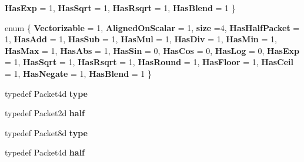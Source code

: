 \begin{DoxyCompactItemize}
{\bfseries Has\+Exp} = 1, 
{\bfseries Has\+Sqrt} = 1, 
{\bfseries Has\+Rsqrt} = 1, 
\newline
{\bfseries Has\+Blend} = 1
 \}
\item 
\mbox{\label{struct_eigen_1_1internal_1_1packet__traits_3_01double_01_4_acacfdb8bbbc458acc112aba3c5d4d400}} 
enum \{ \newline
{\bfseries Vectorizable} = 1, 
{\bfseries Aligned\+On\+Scalar} = 1, 
{\bfseries size} =4, 
{\bfseries Has\+Half\+Packet} = 1, 
\newline
{\bfseries Has\+Add} = 1, 
{\bfseries Has\+Sub} = 1, 
{\bfseries Has\+Mul} = 1, 
{\bfseries Has\+Div} = 1, 
\newline
{\bfseries Has\+Min} = 1, 
{\bfseries Has\+Max} = 1, 
{\bfseries Has\+Abs} = 1, 
{\bfseries Has\+Sin} = 0, 
\newline
{\bfseries Has\+Cos} = 0, 
{\bfseries Has\+Log} = 0, 
{\bfseries Has\+Exp} = 1, 
{\bfseries Has\+Sqrt} = 1, 
\newline
{\bfseries Has\+Rsqrt} = 1, 
{\bfseries Has\+Round} = 1, 
{\bfseries Has\+Floor} = 1, 
{\bfseries Has\+Ceil} = 1, 
\newline
{\bfseries Has\+Negate} = 1, 
{\bfseries Has\+Blend} = 1
 \}
\item 
\mbox{\label{struct_eigen_1_1internal_1_1packet__traits_3_01double_01_4_abfd8cf2aafb10174547c6590f5d34e43}} 
typedef Packet4d {\bfseries type}
\item 
\mbox{\label{struct_eigen_1_1internal_1_1packet__traits_3_01double_01_4_a703f4ec61806f74b62a675bd29cb9349}} 
typedef Packet2d {\bfseries half}
\item 
\mbox{\label{struct_eigen_1_1internal_1_1packet__traits_3_01double_01_4_adf86f5f3309a80b584d0cadcc610ae52}} 
typedef Packet8d {\bfseries type}
\item 
\mbox{\label{struct_eigen_1_1internal_1_1packet__traits_3_01double_01_4_a09ad1352c194ecdf15a0c9f55ea31115}} 
typedef Packet4d {\bfseries half}
\item 
\mbox{\label{struct_eigen_1_1internal_1_1packet__traits_3_01double_01_4_af113faa9c4cc1492c8d7b70329940f64}} 

\end{DoxyCompactItemize}
